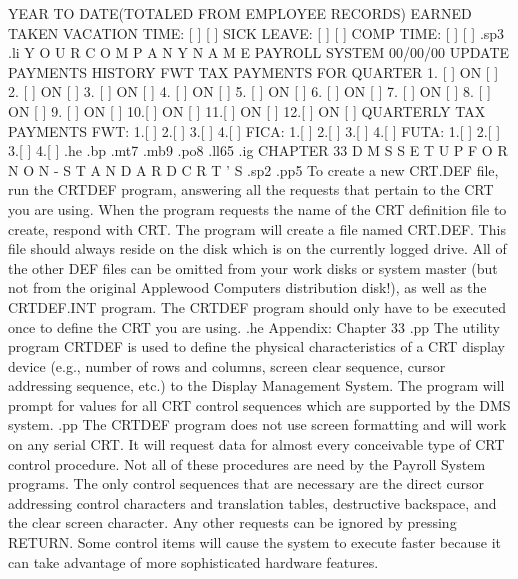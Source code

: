 		    YEAR TO DATE(TOTALED FROM EMPLOYEE RECORDS)
					EARNED		   TAKEN
	       VACATION TIME:	   [		]     [ 	   ]
	       SICK LEAVE:	   [		]     [ 	   ]
	       COMP TIME:	   [		]     [ 	   ]
.sp3
.li
		     Y O U R   C O M P A N Y   N A M E
				PAYROLL SYSTEM
  00/00/00		   UPDATE PAYMENTS HISTORY
			 FWT TAX PAYMENTS FOR QUARTER
		       1. [	       ] ON [	     ]
		       2. [	       ] ON [	     ]
		       3. [	       ] ON [	     ]
		       4. [	       ] ON [	     ]
		       5. [	       ] ON [	     ]
		       6. [	       ] ON [	     ]
		       7. [	       ] ON [	     ]
		       8. [	       ] ON [	     ]
		       9. [	       ] ON [	     ]
		       10.[	       ] ON [	     ]
		       11.[	       ] ON [	     ]
		       12.[	       ] ON [	     ]
			    QUARTERLY TAX PAYMENTS
  FWT:	1.[	       ] 2.[		] 3.[		 ] 4.[		  ]
  FICA: 1.[	       ] 2.[		] 3.[		 ] 4.[		  ]
  FUTA: 1.[	       ] 2.[		] 3.[		 ] 4.[		  ]
.he
.bp
.mt7
.mb9
.po8
.ll65
.ig
CHAPTER 33
D M S	S E T U P    F O R   N O N - S T A N D A R D   C R T ' S
.sp2
.pp5
To create a new CRT.DEF file, run the CRTDEF program, answering all the
requests that pertain to the CRT you are using.  When the program requests
the name of the CRT definition file to create, respond with CRT.  The
program will create a file named CRT.DEF.  This file should always reside
on the
disk which is on the currently logged drive.
All of the other DEF files can be omitted from your work disks or system
master (but not from the original Applewood Computers distribution disk!),
as well as the CRTDEF.INT
program. The CRTDEF program should only have to be executed once to define
the CRT you are using.
.he Appendix: Chapter 33
.pp
The utility program CRTDEF is used to define the physical characteristics of
a CRT display device (e.g., number of rows and columns, screen clear
sequence, cursor addressing sequence, etc.) to the Display Management System.
The program will prompt for
values for all CRT control sequences which are supported by the DMS system.
.pp
The CRTDEF program does not use screen formatting and will work on any serial
CRT.  It will request data for almost every conceivable type of CRT control
procedure.  Not all of these procedures are need by the Payroll
System programs.  The only control sequences that are necessary are
the direct cursor addressing control characters and translation tables,
destructive backspace, and the clear screen character.	Any other requests
can be ignored by pressing RETURN.
Some control items will cause the system to execute faster because it can take
advantage of more sophisticated hardware features.
